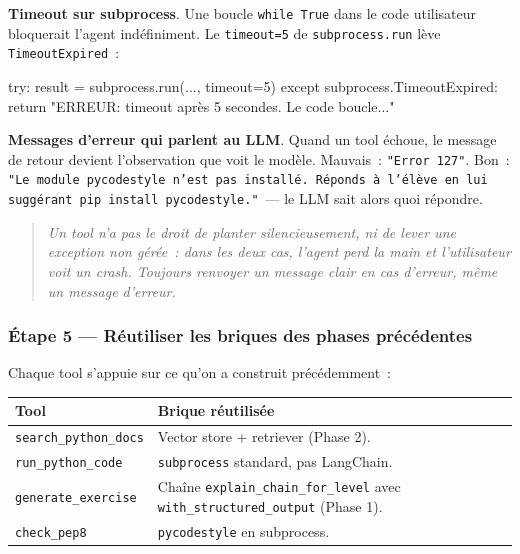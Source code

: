 \documentclass[11pt,a4paper]{article}
\begin{document}
\textbf{Timeout sur subprocess}. Une boucle \texttt{while True} dans le
code utilisateur bloquerait l'agent indéfiniment. Le \texttt{timeout=5}
de \texttt{subprocess.run} lève \texttt{TimeoutExpired}~:

\begin{pythoncode}
try:
    result = subprocess.run(..., timeout=5)
except subprocess.TimeoutExpired:
    return "ERREUR: timeout après 5 secondes. Le code boucle..."
\end{pythoncode}

\textbf{Messages d'erreur qui parlent au LLM}. Quand un tool échoue, le
message de retour devient l'observation que voit le modèle. Mauvais~:
\texttt{"Error 127"}. Bon~: \texttt{"Le module pycodestyle n'est pas
installé. Réponds à l'élève en lui suggérant pip install
pycodestyle."}~— le LLM sait alors quoi répondre.

\begin{quote}\itshape
Un tool n'a pas le droit de planter silencieusement, ni de lever une
exception non gérée~: dans les deux cas, l'agent perd la main et
l'utilisateur voit un crash. Toujours renvoyer un \emph{message clair}
en cas d'erreur, même un message d'erreur.
\end{quote}

\subsubsection*{Étape 5 — Réutiliser les briques des phases précédentes}

Chaque tool s'appuie sur ce qu'on a construit précédemment~:

\begin{center}
\begin{tabular}{p{4.5cm} p{10cm}}
\toprule
\textbf{Tool} & \textbf{Brique réutilisée} \\
\midrule
\texttt{search\_python\_docs} & Vector store + retriever (Phase 2). \\[1mm]
\texttt{run\_python\_code}    & \texttt{subprocess} standard, pas LangChain. \\[1mm]
\texttt{generate\_exercise}   & Chaîne \texttt{explain\_chain\_for\_level}
                                avec \texttt{with\_structured\_output} (Phase 1). \\[1mm]
\texttt{check\_pep8}          & \texttt{pycodestyle} en subprocess. \\
\bottomrule
\end{tabular}
\end{center}
\end{document}

